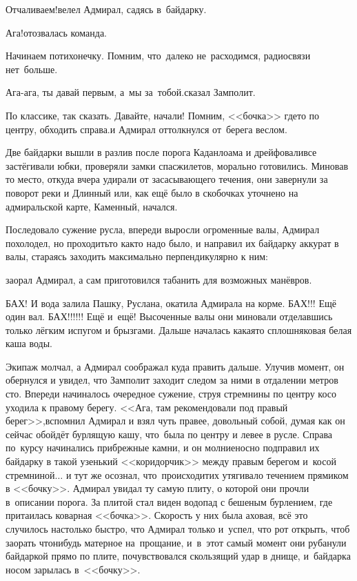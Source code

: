 \diagdash Отчаливаем!\mdash велел Адмирал, садясь в~байдарку.

\diagdash Ага!\mdash отозвалась команда.

\diagdash Начинаем потихонечку. Помним, что~далеко не~расходимся, радиосвязи нет~больше.

\diagdash Ага-ага, ты давай первым, а~мы за~тобой.\mdash сказал Замполит.

\diagdash По классике, так сказать. Давайте, начали! Помним, <<бочка>> где\sdash то по центру, обходить справа.\mdash и Адмирал оттолкнулся от~берега веслом.

Две байдарки вышли в разлив после порога Каданлоама и дрейфовали\mdash все застёгивали юбки, проверяли замки спасжилетов, морально готовились. Миновав то место, откуда вчера удирали от засасывающего течения, они завернули за поворот реки и Длинный или, как ещё было в скобочках уточнено на адмиральской карте, Каменный, начался.

Последовало сужение русла, впереди выросли огроменные валы, Адмирал похолодел, но проходить\sdash то как\sdash то надо было, и направил их байдарку аккурат в валы, стараясь заходить максимально перпендикулярно к ним:

\mdash заорал Адмирал, а сам приготовился табанить для возможных манёвров.

БАХ! И вода залила Пашку, Руслана, окатила Адмирала на корме. БАХ!!! Ещё один вал. БАХ!!!!!! Ещё и~ещё! Высоченные валы они миновали отделавшись только лёгким испугом и брызгами. Дальше началась какая\sdash то сплошняковая белая каша воды. 

Экипаж молчал, а Адмирал соображал куда править дальше. Улучив момент, он обернулся и увидел, что Замполит заходит следом за ними в отдалении метров сто. Впереди начиналось очередное сужение, струя стремнины по центру косо уходила к правому берегу. <<Ага, там рекомендовали под правый берег>>,\mdash вспомнил Адмирал и взял чуть правее, довольный собой, думая как он сейчас обойдёт бурлящую кашу, что~была по центру и левее в русле. Справа по~курсу начинались прибрежные камни, и он молниеносно подправил их байдарку в такой узенький <<коридорчик>> между правым берегом и~косой стремниной$\ldots$ и тут же осознал, что~происходит\mdash их утягивало течением прямиком в <<бочку>>. Адмирал увидал ту самую плиту, о которой они прочли в~описании порога. За плитой стал виден водопад с бешеным бурлением, где притаилась коварная <<бочка>>. Скорость у них была аховая, всё это случилось настолько быстро, что Адмирал только и~успел, что рот открыть, чтоб заорать что\sdash нибудь матерное на~прощание, и~в~этот самый момент они рубанули байдаркой прямо по плите, почувствовался скользящий удар в днище, и~байдарка носом зарылась в~<<бочку>>.

